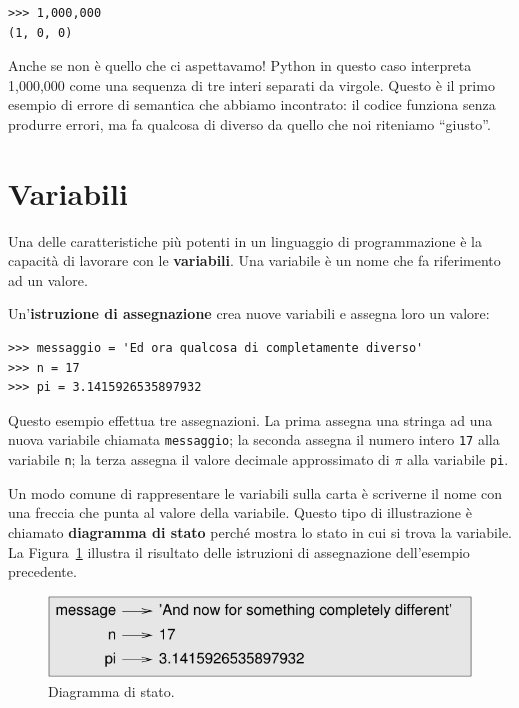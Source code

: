 \documentclass[10pt]{book}
\begin{document}
\begin{verbatim}
>>> 1,000,000
(1, 0, 0)
\end{verbatim}
%
Anche se non è quello che ci aspettavamo! Python in questo caso interpreta 1,000,000 come una sequenza di tre interi separati da virgole. Questo è il primo esempio di errore di semantica che abbiamo incontrato: il codice funziona senza produrre errori, ma fa qualcosa di diverso da quello che noi riteniamo ``giusto''.



\section{Variabili}
\label{variables}

Una delle caratteristiche più potenti in un linguaggio di programmazione è la capacità di lavorare con le {\bf variabili}. Una variabile è un nome che fa riferimento ad un valore.

Un'{\bf istruzione di assegnazione} crea nuove variabili e assegna loro un valore:

\begin{verbatim}
>>> messaggio = 'Ed ora qualcosa di completamente diverso'
>>> n = 17
>>> pi = 3.1415926535897932
\end{verbatim}
%
Questo esempio effettua tre assegnazioni. La prima assegna una stringa
ad una nuova variabile chiamata {\tt messaggio}; la seconda assegna il numero intero {\tt 17} alla variabile {\tt n}; la terza assegna il valore decimale approssimato di $\pi$ alla variabile {\tt pi}.

Un modo comune di rappresentare le variabili sulla carta è scriverne il nome con una freccia che punta al valore della variabile. Questo tipo di illustrazione è chiamato {\bf diagramma di stato} perché mostra lo stato in cui si trova la variabile. La Figura~\ref{fig.state2} illustra il risultato delle istruzioni di assegnazione dell'esempio precedente.

\begin{figure}
\centerline
{\includegraphics[scale=0.8]{figs/state2.pdf}}
\caption{Diagramma di stato.}
\label{fig.state2}
\end{figure}
\end{document}
